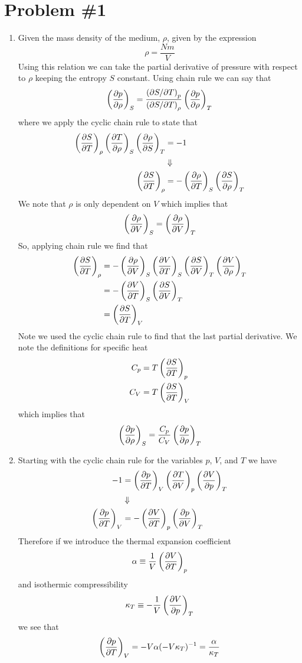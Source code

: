 \documentclass[11pt]{article}
\numberwithin{equation}{section}
\begin{document}


\section{Problem \#1}
\begin{enumerate}[(1)]
\item Given the mass density of the medium, $\rho$, given by the expression
$$\rho = \frac{Nm}{V}$$
Using this relation we can take the partial derivative of pressure with respect to $\rho$ 
keeping the entropy $S$ constant. Using chain rule we can say that
$$\left(\frac{\partial{p}}{\partial{\rho}}\right)_{S} = \frac{\left(\partial{S}/\partial{T}\right)_{p}}{\left(\partial{S}/\partial{T}\right)_{\rho}}\left(\frac{\partial{p}}{\partial{\rho}}\right)_{T}$$
where we apply the cyclic chain rule to state that
\begin{align*}
\left(\frac{\partial{S}}{\partial{T}}\right)_{\rho}\left(\frac{\partial{T}}{\partial{\rho}}\right)_{S}\left(\frac{\partial{\rho}}{\partial{S}}\right)_{T} &= -1\\
&\Downarrow\\
\left(\frac{\partial{S}}{\partial{T}}\right)_{\rho} &= -\left(\frac{\partial{\rho}}{\partial{T}}\right)_{S}\left(\frac{\partial{S}}{\partial{\rho}}\right)_{T}
\end{align*}
We note that $\rho$ is only dependent on $V$ which implies that 
$$\left(\frac{\partial{\rho}}{\partial{V}}\right)_{S} = \left(\frac{\partial{\rho}}{\partial{V}}\right)_{T}$$ 
So, applying chain rule we find that
\begin{align*}
\left(\frac{\partial{S}}{\partial{T}}\right)_{\rho} &= -\left(\frac{\partial{\rho}}{\partial{V}}\right)_{S}\left(\frac{\partial{V}}{\partial{T}}\right)_{S}\left(\frac{\partial{S}}{\partial{V}}\right)_{T}\left(\frac{\partial{V}}{\partial{\rho}}\right)_{T}\\
&= -\left(\frac{\partial{V}}{\partial{T}}\right)_{S}\left(\frac{\partial{S}}{\partial{V}}\right)_{T}\\
&= \left(\frac{\partial{S}}{\partial{T}}\right)_{V}
\end{align*}
Note we used the cyclic chain rule to find that the last partial derivative. We note the 
definitions for specific heat
\begin{align*}
C_p &= T\left(\frac{\partial{S}}{\partial{T}}\right)_{p}\\
C_V &= T\left(\frac{\partial{S}}{\partial{T}}\right)_{V}
\end{align*}
which implies that
$$\left(\frac{\partial{p}}{\partial{\rho}}\right)_{S} = \frac{C_p}{C_V}\left(\frac{\partial{p}}{\partial{\rho}}\right)_{T}$$

\item Starting with the cyclic chain rule for the variables $p$, $V$, and $T$ we have
\begin{align*}
-1 &= \left(\frac{\partial{p}}{\partial{T}}\right)_{V}\left(\frac{\partial{T}}{\partial{V}}\right)_{p}\left(\frac{\partial{V}}{\partial{p}}\right)_{T}\\
&\Downarrow\\
\left(\frac{\partial{p}}{\partial{T}}\right)_{V} &= -\left(\frac{\partial{V}}{\partial{T}}\right)_{p}\left(\frac{\partial{p}}{\partial{V}}\right)_{T}\\
\end{align*}
Therefore if we introduce the thermal expansion coefficient 
$$\alpha \equiv \frac{1}{V}\left(\frac{\partial{V}}{\partial{T}}\right)_{p}$$
and isothermic compressibility
$$\kappa_{T} \equiv -\frac{1}{V}\left(\frac{\partial{V}}{\partial{p}}\right)_{T}$$ 
we see that
$$\left(\frac{\partial{p}}{\partial{T}}\right)_{V} = -V\alpha(-V\kappa_T)^{-1} = \frac{\alpha}{\kappa_T}$$


\end{enumerate}
\end{document}
